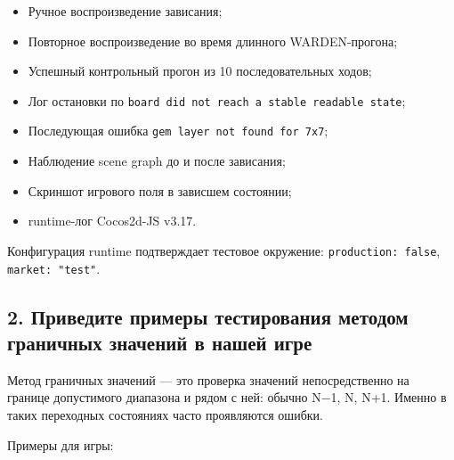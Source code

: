 \documentclass{ZGJournalArticle_2026}
\providecommand{\tightlist}{%
  \setlength{\itemsep}{0pt}\setlength{\parskip}{0pt}}
\begin{document}
\begin{itemize}
\tightlist
\item
  Ручное воспроизведение зависания;
\item
  Повторное воспроизведение во время длинного WARDEN-прогона;
\item
  Успешный контрольный прогон из 10 последовательных ходов;
\item
  Лог остановки по
  \texttt{board\ did\ not\ reach\ a\ stable\ readable\ state};
\item
  Последующая ошибка \texttt{gem\ layer\ not\ found\ for\ 7x7};
\item
  Наблюдение scene graph до и после зависания;
\item
  Скриншот игрового поля в зависшем состоянии;
\item
  runtime-лог Cocos2d-JS v3.17.
\end{itemize}

Конфигурация runtime подтверждает тестовое окружение:
\texttt{production:\ false}, \texttt{market:\ "test"}.

\newpage

\subsection{2. Приведите примеры тестирования методом граничных значений
в нашей
игре}\label{ux43fux440ux438ux432ux435ux434ux438ux442ux435-ux43fux440ux438ux43cux435ux440ux44b-ux442ux435ux441ux442ux438ux440ux43eux432ux430ux43dux438ux44f-ux43cux435ux442ux43eux434ux43eux43c-ux433ux440ux430ux43dux438ux447ux43dux44bux445-ux437ux43dux430ux447ux435ux43dux438ux439-ux432-ux43dux430ux448ux435ux439-ux438ux433ux440ux435}

Метод граничных значений --- это проверка значений непосредственно на
границе допустимого диапазона и рядом с ней: обычно N−1, N, N+1. Именно
в таких переходных состояниях часто проявляются ошибки.

Примеры для игры:
\end{document}
